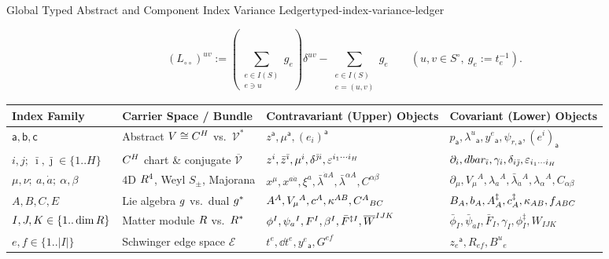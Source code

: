 \begin{zkmodule}{Global Typed Abstract and Component Index Variance Ledger}{typed-index-variance-ledger}
\begin{itemize}[leftmargin=*]
  \begin{equation}
  \label{eq:Lcirc-ledger-def}
  (L_{\circ\circ})^{uv} := \left(\sum_{\substack{e\in I(S)\\ e\ni u}} g_e\right)\delta^{uv} - \sum_{\substack{e\in I(S)\\ e=(u,v)}} g_e\qquad (u,v \in S^\circ,\ g_e := t_e^{-1}).
  \end{equation}
\end{itemize}
\end{zkmodule}

\begin{table}[H]
\centering
\scriptsize
\setlength{\tabcolsep}{3.4pt}
\renewcommand{\arraystretch}{1.16}
\begin{tabularx}{\textwidth}{@{}ll>{\raggedright\arraybackslash}X>{\raggedright\arraybackslash}X@{}}
\toprule
\textbf{Index Family} & \textbf{Carrier Space / Bundle} & \textbf{Contravariant (Upper) Objects} & \textbf{Covariant (Lower) Objects} \\
\midrule
$\mathsf{a},\mathsf{b},\mathsf{c}$ & Abstract $V \cong C^H$ vs.\ $\mathcal{V}^*$ & $z^{\mathsf{a}}, \mu^{\mathsf{a}}, (e_i)^{\mathsf{a}}$ & $p_{\mathsf{a}}, \lambda^u{}_{\mathsf{a}}, y^e{}_{\mathsf{a}}, \psi_{r,\mathsf{a}}, (e^i)_{\mathsf{a}}$ \\
$i,j;\ \bar{\imath},\bar{\jmath} \in \{1..H\}$ & $C^H$ chart \& conjugate $\overline{\mathcal{V}}$ & $z^i, \bar{z}^{\bar{\imath}}, \mu^i, \delta^{\bar{\jmath}i}, \varepsilon^{i_1\cdots i_H}$ & $\partial_i, dbar_{\bar{\imath}}, \gamma_i, \delta_{i\bar{\jmath}}, \varepsilon_{i_1\cdots i_H}$ \\
$\mu,\nu;\ a,\dot{a};\ \alpha,\beta$ & $4\mathrm{D}$ $R^4$, Weyl $S_\pm$, Majorana & $x^\mu, x^{a\dot{a}}, \xi^a, \bar{\lambda}^{\dot{a}A}, \bar{\lambda}^{\alpha A}, C^{\alpha\beta}$ & $\partial_\mu, V_\mu{}^A, \lambda_a{}^A, \bar{\lambda}_{\dot{a}}{}^A, \lambda_\alpha{}^A, C_{\alpha\beta}$ \\
$A,B,C,E$ & Lie algebra $g$ vs.\ dual $g^*$ & $A^A, V_\mu{}^A, c^A, \kappa^{AB}, C^A{}_{BC}$ & $B_A, b_A, A^\ddagger_A, c^\ddagger_A, \kappa_{AB}, f_{ABC}$ \\
$I,J,K \in \{1..\dim R\}$ & Matter module $R$ vs.\ $R^*$ & $\phi^I, \psi_a{}^I, F^I, \beta^I, \bar{F}^{\ddagger I}, \overline{W}^{IJK}$ & $\bar{\phi}_I, \bar{\psi}_{\dot{a}I}, \bar{F}_I, \gamma_I, \phi^\ddagger_I, W_{IJK}$ \\
$e,f \in \{1..|I|\}$ & Schwinger edge space $\mathcal{E}$ & $t^e, \dd t^e, y^e{}_{\mathsf{a}}, G^{ef}$ & $z_e{}^{\mathsf{a}}, R_{ef}, B^u{}_e$ \\

\end{tabularx}
\end{table}
